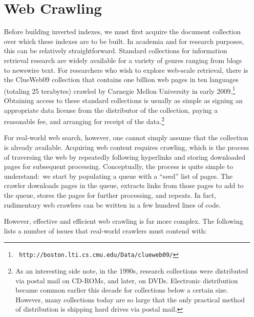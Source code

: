 \section{Web Crawling}
\label{chapter-indexing:crawling}

Before building inverted indexes, we must first acquire the document
collection over which these indexes are to be built.  In academia and
for research purposes, this can be relatively straightforward.
Standard collections for information retrieval research are widely
available for a variety of genres ranging from blogs to newswire text.
For researchers who wish to explore web-scale retrieval, there is the
ClueWeb09 collection that contains one billion web pages in ten
languages (totaling 25 terabytes) crawled by Carnegie Mellon
University in early 2009.\footnote{\texttt{
    http://boston.lti.cs.cmu.edu/Data/clueweb09/}} Obtaining access to
these standard collections is usually as simple as signing an
appropriate data license from the distributor of the collection,
paying a reasonable fee, and arranging for receipt of the
data.\footnote{As an interesting side note, in the 1990s, research
  collections were distributed via postal mail on CD-ROMs, and later,
  on DVDs.  Electronic distribution became common earlier this decade
  for collections below a certain size.  However, many collections
  today are so large that the only practical method of distribution is
  shipping hard drives via postal mail.}

For real-world web search, however, one cannot simply assume that the
collection is already available.  Acquiring web content requires
crawling, which is the process of traversing the web by repeatedly
following hyperlinks and storing downloaded pages for subsequent
processing.  Conceptually, the process is quite simple to
understand:\ we start by populating a queue with a ``seed'' list of
pages.  The crawler downloads pages in the queue, extracts links from
those pages to add to the queue, stores the pages for further
processing, and repeats.  In fact, rudimentary web crawlers can be
written in a few hundred lines of code.

However, effective and efficient web crawling is far more complex.
The following lists a number of issues that real-world crawlers must
contend with:

